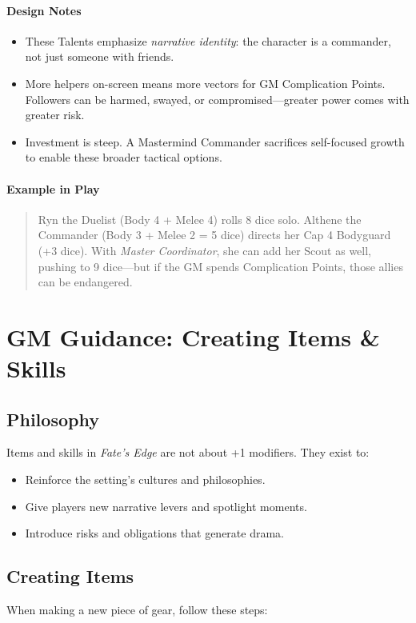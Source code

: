 \documentclass[12pt]{book}
\begin{document}
\paragraph{Design Notes}
\begin{itemize}
  \item These Talents emphasize \emph{narrative identity}: the character is a commander, not just someone with friends.
  \item More helpers on-screen means more vectors for GM Complication Points. Followers can be harmed, swayed, or compromised—greater power comes with greater risk.
  \item Investment is steep. A Mastermind Commander sacrifices self-focused growth to enable these broader tactical options.
\end{itemize}

\paragraph{Example in Play}
\begin{quote}
Ryn the Duelist (Body 4 + Melee 4) rolls 8 dice solo.
Althene the Commander (Body 3 + Melee 2 = 5 dice) directs her Cap 4 Bodyguard (+3 dice). With \emph{Master Coordinator}, she can add her Scout as well, pushing to 9 dice—but if the GM spends Complication Points, those allies can be endangered.
\end{quote}

\section*{GM Guidance: Creating Items \& Skills}

\subsection*{Philosophy}
Items and skills in \textit{Fate’s Edge} are not about +1 modifiers.  
They exist to:
\begin{itemize}
  \item Reinforce the setting’s cultures and philosophies.
  \item Give players new narrative levers and spotlight moments.
  \item Introduce risks and obligations that generate drama.
\end{itemize}

\subsection*{Creating Items}
When making a new piece of gear, follow these steps:
\end{document}
